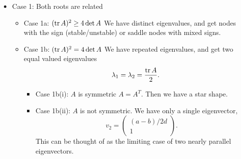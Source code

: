 \documentclass{article}
\numberwithin{equation}{section}
\begin{document}
\begin{itemize}
    \item Case 1: Both roots are related
    \begin{itemize}
        \item Case 1a: $(\tr A)^2 \ge 4 \det A$ We have distinct eigenvalues, and get nodes with the sign (stable/unstable) or saddle nodes with mixed signs.
        \item Case 1b: $(\tr A)^2 = 4 \det A$ We have repeated eigenvalues, and get two equal valued eigenvalues 
        \begin{equation*}
            \lambda_1=\lambda_2 = \frac{\tr A}{2}.
        \end{equation*}
        \begin{itemize}
            \item Case 1b(i): $A$ is symmetric $A=A^T.$ Then we have a star shape.
            \item Case 1b(ii): $A$ is not symmetric. We have only a single eigenvector,
            \begin{equation*}
                v_2=\begin{pmatrix}
                    (a-b)/2d \\ 1
                \end{pmatrix}.
            \end{equation*}
            This can be thought of as the limiting case of two nearly parallel eigenvectors.
        \end{itemize}
    \end{itemize}
\end{itemize}
\end{document}
